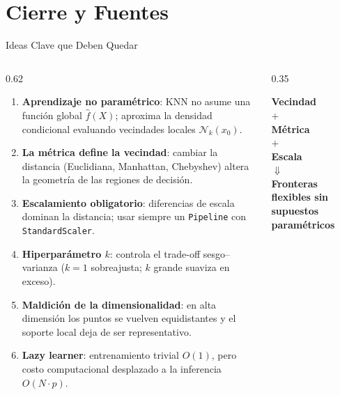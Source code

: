\section{Cierre y Fuentes}

\begin{frame}{Ideas Clave que Deben Quedar}
\footnotesize
\begin{columns}[T,onlytextwidth]
\begin{column}{0.62\textwidth}
\begin{enumerate}\setlength{\itemsep}{0.22em}
  \item \textbf{Aprendizaje no paramétrico}: KNN no asume una función global $\hat{f}(X)$; aproxima la densidad condicional evaluando vecindades locales $\mathcal{N}_k(x_0)$.
  \item \textbf{La métrica define la vecindad}: cambiar la distancia (Euclidiana, Manhattan, Chebyshev) altera la geometría de las regiones de decisión.
  \item \textbf{Escalamiento obligatorio}: diferencias de escala dominan la distancia; usar siempre un \texttt{Pipeline} con \texttt{StandardScaler}.
  \item \textbf{Hiperparámetro $k$}: controla el trade-off sesgo--varianza ($k=1$ sobreajusta; $k$ grande suaviza en exceso).
  \item \textbf{Maldición de la dimensionalidad}: en alta dimensión los puntos se vuelven equidistantes y el soporte local deja de ser representativo.
  \item \textbf{Lazy learner}: entrenamiento trivial $O(1)$, pero costo computacional desplazado a la inferencia $O(N \cdot p)$.
\end{enumerate}
\end{column}

\begin{column}{0.35\textwidth}
\begin{keybox}
\centering
\textbf{Vecindad}\\[0.08cm]
$+$\\[0.08cm]
\textbf{Métrica}\\[0.08cm]
$+$\\[0.08cm]
\textbf{Escala}\\[0.10cm]
$\Downarrow$\\[0.10cm]
\scriptsize
\textbf{Fronteras flexibles sin supuestos paramétricos}
\end{keybox}

\vspace{0.10cm}
\centering
{} \quad {} \\[0.10cm]
 \quad {}
\end{column}
\end{columns}
\end{frame}


